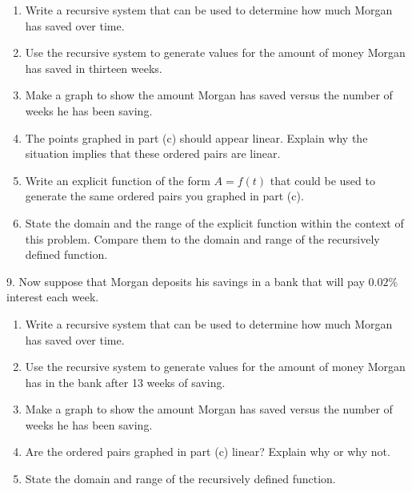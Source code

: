 \documentclass[10pt,]{book}
\theoremstyle{plain}
\theoremstyle{definition}
\theoremstyle{definition}
\theoremstyle{definition}
\numberwithin{equation}{section}
\begin{document}
\begin{exerciselist}
\begin{enumerate}[label=(\alph*)]
\item\hypertarget{li-34}{}Write a recursive system that can be used to determine how much Morgan has saved over time.%
\item\hypertarget{li-35}{}Use the recursive system to generate values for the amount of money Morgan has saved in thirteen weeks.%
\item\hypertarget{li-36}{}Make a graph to show the amount Morgan has saved versus the number of weeks he has been saving.%
\item\hypertarget{li-37}{}The points graphed in part (c) should appear linear.  Explain why the situation implies that these ordered pairs are linear.%
\item\hypertarget{li-38}{}Write an explicit function of the form \(A=f(t)\) that could be used to generate the same ordered pairs you graphed in part (c).%
\item\hypertarget{li-39}{}State the domain and the range of the explicit function within the context of this problem.  Compare them to the domain and range of the recursively defined function.%
\end{enumerate}
%
\par\smallskip
\item[9.]\hypertarget{exercise-11}{}Now suppose that Morgan deposits his savings in a bank that will pay \(0.02\%\) interest each week. \leavevmode%
\begin{enumerate}[label=(\alph*)]
\item\hypertarget{li-40}{}Write a recursive system that can be used to determine how much Morgan has saved over time.%
\item\hypertarget{li-41}{}Use the recursive system to generate values for the amount of money Morgan has in the bank after 13 weeks of saving.%
\item\hypertarget{li-42}{}Make a graph to show the amount Morgan has saved versus the number of weeks he has been saving.%
\item\hypertarget{li-43}{}Are the ordered pairs graphed in part (c) linear?  Explain why or why not.%
\item\hypertarget{li-44}{}State the domain and range of the recursively defined function.%
\end{enumerate}
%
\par\smallskip
\end{exerciselist}
\typeout{************************************************}
\typeout{************************************************}
\end{document}
